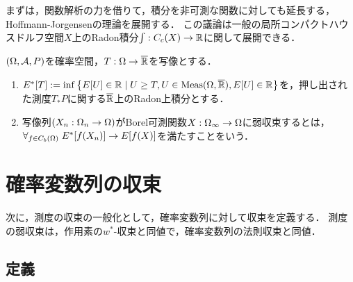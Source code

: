 \documentclass[uplatex,dvipdfmx]{jsreport}
\begin{document}
\begin{tcolorbox}[colframe=ForestGreen, colback=ForestGreen!10!white,breakable,colbacktitle=ForestGreen!40!white,coltitle=black,fonttitle=\bfseries\sffamily,
title=]
    まずは，関数解析の力を借りて，積分を非可測な関数に対しても延長する，Hoffmann-Jorgensenの理論を展開する．
    この議論は一般の局所コンパクトハウスドルフ空間$X$上のRadon積分$\int:C_c(X)\to\mathbb{R}$に関して展開できる．
\end{tcolorbox}

\begin{definition}
    $(\Omega,\mathcal{A},P)$を確率空間，$T:\Omega\to\overline{\mathbb{R}}$を写像とする．
    \begin{enumerate}
        \item $E^*[T]:=\inf\left\{E[U]\in\mathbb{R}\mid U\ge T,U\in\mathrm{Meas}(\Omega,\overline{\mathbb{R}}),E[U]\in\mathbb{R}\right\}$を，押し出された測度$T_*P$に関する$\overline{\mathbb{R}}$上のRadon上積分とする．
        \item 写像列$(X_n:\Omega_n\to\Omega)$がBorel可測関数$X:\Omega_\infty\to\Omega$に弱収束するとは，$\forall_{f\in C_b(\Omega)}\;E^*[f(X_n)]\to E[f(X)]$を満たすことをいう．
    \end{enumerate}
\end{definition}

\section{確率変数列の収束}

\begin{tcolorbox}[colframe=ForestGreen, colback=ForestGreen!10!white,breakable,colbacktitle=ForestGreen!40!white,coltitle=black,fonttitle=\bfseries\sffamily,
title=]
    次に，測度の収束の一般化として，確率変数列に対して収束を定義する．
    測度の弱収束は，作用素の$w^*$-収束と同値で，確率変数列の法則収束と同値．
\end{tcolorbox}

\subsection{定義}
\end{document}
